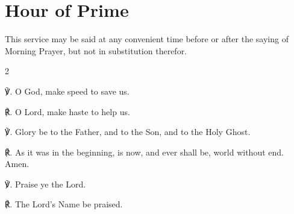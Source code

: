 \fancyhead[RE,LO]{}
\section{Hour of Prime}

\vspace{-0.5\baselineskip}

\begin{secrubric}
	This service may be said at any convenient time before or after the saying of Morning Prayer, but not in substitution therefor.
\end{secrubric}

\vspace{-0.5\baselineskip}

\begin{multicols}{2}

℣. O God, {} make speed to save us.

℟. O Lord, make haste to help us.

℣. Glory be to the Father, and to the Son, and to the Holy Ghost.

℟. As it was in the beginning, is now, and ever shall be, world without end. Amen.

℣. Praise ye the Lord.

℟. The Lord's Name be praised.


\end{multicols}
